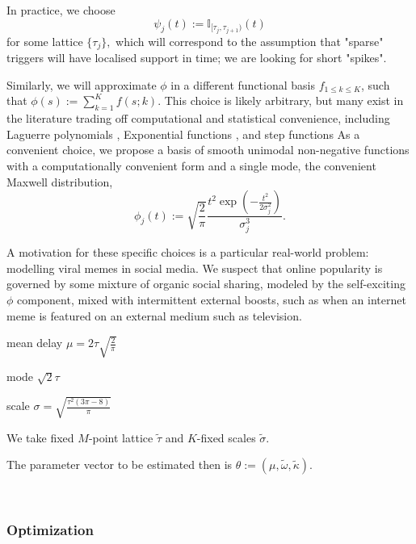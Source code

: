 \documentclass[11pt]{article}
\begin{document}
In practice, we choose
\[\psi_j(t) := \mathbb{I}_{[\tau_{j},\tau_{j+1})}(t)\] for some lattice
$\{\tau_j\},$ which will correspond to the assumption that "sparse"
triggers will have localised support in time; we are looking for short
"spikes".

Similarly, we will approximate $\phi$ in a different functional basis
${f}_{1\leq k \leq K}$, such that $\phi(s):= \sum_{k=1}^K f(s;k)$. This
choice is likely arbitrary, but many exist in the literature trading off
computational and statistical convenience, including Laguerre
polynomials \cite{ogata_linear_1982}, Exponential functions
\cite{schoenberg_conistent_2005,rambaldi_modeling_2015}, and step
functions \cite{eichler_graphical_2016} As a convenient choice, we
propose a basis of smooth unimodal non-negative functions with a
computationally convenient form and a single mode, the convenient
Maxwell distribution,
\[\phi_j(t):=\sqrt{\frac{2}{\pi}} \frac{t^2\exp\left(-\frac{t^2}{2\sigma_j^2}\right)}{\sigma_j^3}.\]

A motivation for these specific choices is a particular real-world
problem: modelling viral memes in social media. We suspect that online
popularity is governed by some mixture of organic social sharing,
modeled by the self-exciting $\phi$ component, mixed with intermittent
external boosts, such as when an internet meme is featured on an
external medium such as television.

    mean delay $\mu=2\tau \sqrt{\frac{2}{\pi}}$

mode $\sqrt{2}\tau$

scale $\sigma=\sqrt{\frac{\tau^2(3 \pi - 8)}{\pi}}$

We take fixed $M$-point lattice $\tilde{\tau}$ and $K$-fixed scales
$\tilde{\sigma}.$

The parameter vector to be estimated then is
$\theta:=(\mu, \tilde{\omega}, \tilde{\kappa}).$



    \begin{center}
    \end{center}
    { \hspace*{\fill} \\}
    
    \subsubsection{Optimization}\label{optimization}
\end{document}

